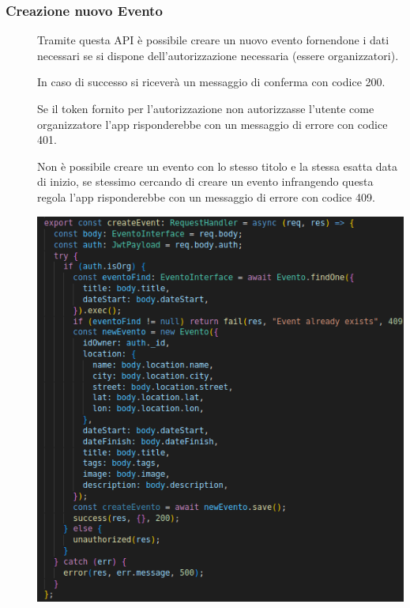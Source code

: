\documentclass{article}
\begin{document}
\subsubsection{Creazione nuovo Evento}
\begin{description}
    \item[] Tramite questa API è possibile creare un nuovo evento fornendone i dati necessari se si dispone dell'autorizzazione necessaria (essere organizzatori).
    \item[] In caso di successo si riceverà un messaggio di conferma con codice 200.
    \item[] Se il token fornito per l'autorizzazione non autorizzasse l'utente come organizzatore l'app risponderebbe con un messaggio di errore con codice 401.
    \item[] Non è possibile creare un evento con lo stesso titolo e la stessa esatta data di inizio, se stessimo cercando di creare un evento infrangendo questa regola l'app risponderebbe con un messaggio di errore con codice 409.
    \item[] \begin{center}
            \includegraphics[scale=0.5]{newEvent.png}
        \end{center}
\end{description}
\clearpage
\end{document}
